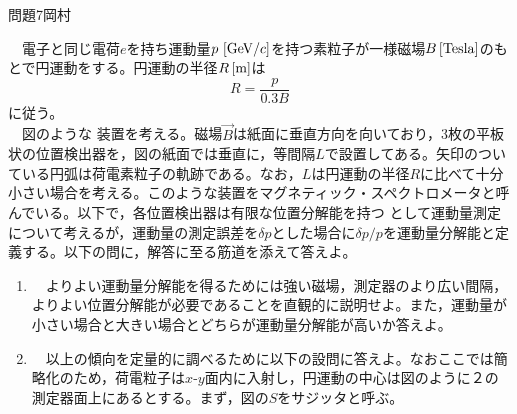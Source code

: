 \documentclass[fleqn]{jbook}
\begin{document}

\begin{question}{問題7}{岡村}
\setcounter{equation}{0}

　電子と同じ電荷$e$を持ち運動量$p~[{\rm GeV}/c]$を持つ素粒子が一様磁場$B\,{\rm [Tesla]}$のもとで円運動をする。円運動の半径$R\,{\rm [m]}$は
  \begin{equation}
  R=\frac{p}{0.3B}
  \end{equation}
  に従う。\\
  　図のような%
  装置を考える。磁場$\Vec{B}$は紙面に垂直方向を向いており，3枚の平板状の位置検出器を，図の紙面では垂直に，等間隔$L$で設置してある。矢印のついている円弧は荷電素粒子の軌跡である。なお，$L$は円運動の半径$R$に比べて十分小さい場合を考える。このような装置をマグネティック・スペクトロメータと呼んでいる。以下で，各位置検出器は有限な位置分解能を持つ%
  として運動量測定について考えるが，運動量の測定誤差を$\delta p$とした場合に$\delta p/p$を運動量分解能と定義する。以下の問に，解答に至る筋道を添えて答えよ。\\
\begin{figure}[hbt]
\begin{center}
\vspace{-0.2cm}
\hspace{-1.0cm}
\vspace{-0.5cm}
\end{center}
\end{figure}


\begin{enumerate}

  \item 　よりよい運動量分解能を得るためには強い磁場，測定器のより広い間隔，よりよい位置分解能が必要であることを直観的に説明せよ。また，運動量が小さい場合と大きい場合とどちらが運動量分解能が高いか答えよ。\\
  
  
  \item 　以上の傾向を定量的に調べるために以下の設問に答えよ。なおここでは簡略化のため，荷電粒子は$x$-$y$面内に入射し，円運動の中心は図のように２の測定器面上にあるとする。まず，図の$S$をサジッタと呼ぶ。\\
  

\end{enumerate}
\end{question}
\end{document}
